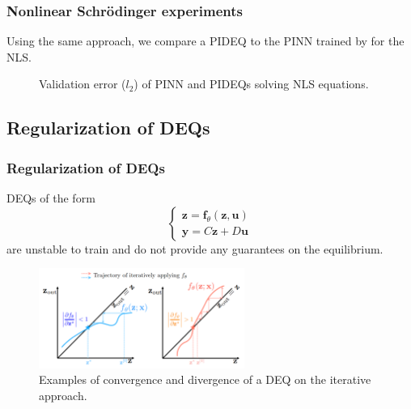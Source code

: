 \documentclass[t]{beamer}
\begin{document}
\begin{frame}
    \frametitle{Nonlinear Schrödinger experiments}
    Using the same approach, we compare a PIDEQ to the PINN trained by \cite{Raissi2019} for the NLS.

    \begin{figure}[h]
        \centering
        \caption{Validation error ($l_2$) of PINN and PIDEQs solving NLS equations.}
        \label{fig:nls-validation-ls-png}
    \end{figure}
\end{frame}

\subsection{Regularization of DEQs}

\begin{frame}
    \frametitle{Regularization of DEQs}
    DEQs of the form \[
    \begin{cases}
	\bm{z} = \bm{f}_{\theta}\left( \bm{z},\bm{u} \right)  \\
	\bm{y} = C\bm{z} + D\bm{u}
    \end{cases}
    \] are unstable to train and do not provide any guarantees on the equilibrium.

    \begin{figure}[h]
        \centering
        \includegraphics[width=0.6\textwidth]{reg-jac-f-theta.png}
        \caption{Examples of convergence and divergence of a DEQ on the iterative approach.}
        \label{fig:reg-jac-f-theta-png}
    \end{figure}
\end{frame}
\end{document}
